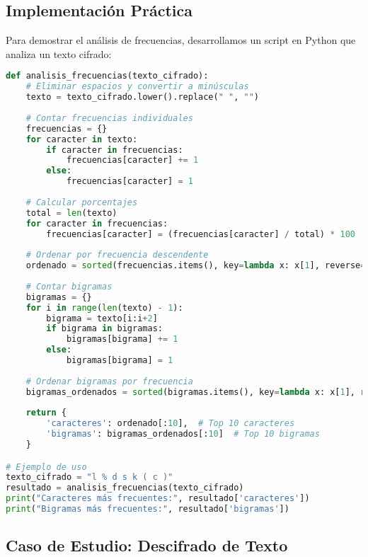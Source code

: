 \subsection{Implementación Práctica}

Para demostrar el análisis de frecuencias, desarrollamos un script en Python que analiza un texto cifrado:

\begin{lstlisting}[language=Python, caption={Implementación de Análisis de Frecuencias}, label=lst:analisis-frecuencias]
def analisis_frecuencias(texto_cifrado):
    # Eliminar espacios y convertir a minúsculas
    texto = texto_cifrado.lower().replace(" ", "")
    
    # Contar frecuencias individuales
    frecuencias = {}
    for caracter in texto:
        if caracter in frecuencias:
            frecuencias[caracter] += 1
        else:
            frecuencias[caracter] = 1
    
    # Calcular porcentajes
    total = len(texto)
    for caracter in frecuencias:
        frecuencias[caracter] = (frecuencias[caracter] / total) * 100
    
    # Ordenar por frecuencia descendente
    ordenado = sorted(frecuencias.items(), key=lambda x: x[1], reverse=True)
    
    # Contar bigramas
    bigramas = {}
    for i in range(len(texto) - 1):
        bigrama = texto[i:i+2]
        if bigrama in bigramas:
            bigramas[bigrama] += 1
        else:
            bigramas[bigrama] = 1
    
    # Ordenar bigramas por frecuencia
    bigramas_ordenados = sorted(bigramas.items(), key=lambda x: x[1], reverse=True)
    
    return {
        'caracteres': ordenado[:10],  # Top 10 caracteres
        'bigramas': bigramas_ordenados[:10]  # Top 10 bigramas
    }

# Ejemplo de uso
texto_cifrado = "l % d s k ( c )"
resultado = analisis_frecuencias(texto_cifrado)
print("Caracteres más frecuentes:", resultado['caracteres'])
print("Bigramas más frecuentes:", resultado['bigramas'])
\end{lstlisting}

\subsection{Caso de Estudio: Descifrado de Texto}

